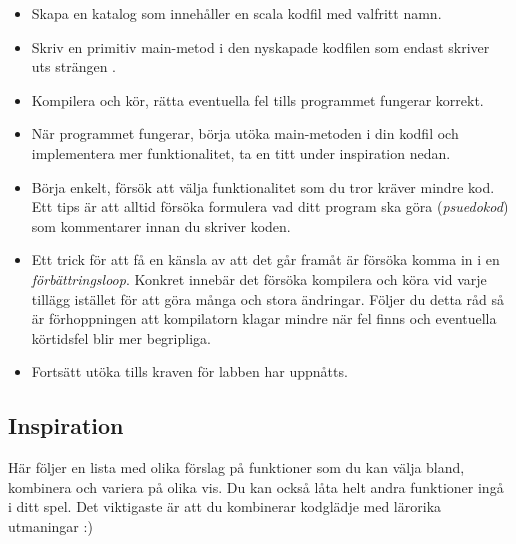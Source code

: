 \begin{itemize}
\item Skapa en katalog som innehåller en scala kodfil med valfritt namn.
\item Skriv en primitiv main-metod i den nyskapade kodfilen som endast skriver uts strängen .
\item Kompilera och kör, rätta eventuella fel tills programmet fungerar korrekt.
\item När programmet fungerar, börja utöka main-metoden i din kodfil och implementera mer funktionalitet, ta en titt under inspiration nedan.
\item Börja enkelt, försök att välja funktionalitet som du tror kräver mindre kod. Ett tips är att alltid försöka formulera vad ditt program ska göra (\emph{psuedokod}) som kommentarer innan du skriver koden.
\item Ett trick för att få en känsla av att det går framåt är försöka komma in i en \emph{förbättringsloop}. Konkret innebär det försöka kompilera och köra vid varje tillägg istället för att göra många och stora ändringar. Följer du detta råd så är förhoppningen att kompilatorn klagar mindre när fel finns och eventuella körtidsfel blir mer begripliga.                                                                      
\item Fortsätt utöka tills kraven för labben har uppnåtts.
\end{itemize}

\subsection{Inspiration}

Här följer en lista med olika förslag på funktioner som du kan välja bland, kombinera och variera på olika vis. Du kan också låta helt andra funktioner ingå i ditt spel. Det viktigaste är att du kombinerar kodglädje med lärorika utmaningar :)

